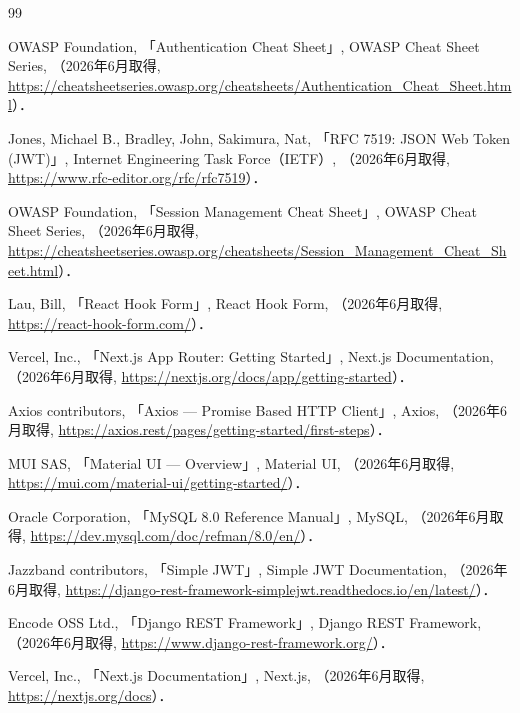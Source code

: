 


\begingroup
\let\em\upshape
\begin{thebibliography}{99}

OWASP Foundation, 「Authentication Cheat Sheet」, OWASP Cheat Sheet Series,
（2026年6月取得, \url{https://cheatsheetseries.owasp.org/cheatsheets/Authentication_Cheat_Sheet.html}）．

Jones, Michael B., Bradley, John, Sakimura, Nat, 「RFC 7519: JSON Web Token (JWT)」,
Internet Engineering Task Force（IETF）,
（2026年6月取得, \url{https://www.rfc-editor.org/rfc/rfc7519}）．

OWASP Foundation, 「Session Management Cheat Sheet」, OWASP Cheat Sheet Series,
（2026年6月取得, \url{https://cheatsheetseries.owasp.org/cheatsheets/Session_Management_Cheat_Sheet.html}）．

Lau, Bill, 「React Hook Form」, React Hook Form,
（2026年6月取得, \url{https://react-hook-form.com/}）．

Vercel, Inc., 「Next.js App Router: Getting Started」, Next.js Documentation,
（2026年6月取得, \url{https://nextjs.org/docs/app/getting-started}）．

Axios contributors, 「Axios --- Promise Based HTTP Client」, Axios,
（2026年6月取得, \url{https://axios.rest/pages/getting-started/first-steps}）．

MUI SAS, 「Material UI --- Overview」, Material UI,
（2026年6月取得, \url{https://mui.com/material-ui/getting-started/}）．

Oracle Corporation, 「MySQL 8.0 Reference Manual」, MySQL,
（2026年6月取得, \url{https://dev.mysql.com/doc/refman/8.0/en/}）．

Jazzband contributors, 「Simple JWT」, Simple JWT Documentation,
（2026年6月取得, \url{https://django-rest-framework-simplejwt.readthedocs.io/en/latest/}）．

Encode OSS Ltd., 「Django REST Framework」, Django REST Framework,
（2026年6月取得, \url{https://www.django-rest-framework.org/}）．

Vercel, Inc., 「Next.js Documentation」, Next.js,
（2026年6月取得, \url{https://nextjs.org/docs}）．


\end{thebibliography}
